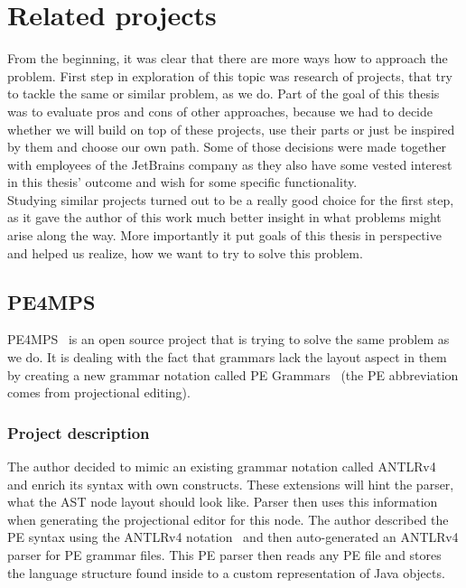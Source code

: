 \chapter{Related projects}
\label{chap:related_projects}

From the beginning, it was clear that there are more ways how to approach the problem. First step in exploration of this topic was research of projects, that try to tackle the same or similar problem, as we do. Part of the goal of this thesis was to evaluate pros and cons of other approaches, because we had to decide whether we will build on top of these projects, use their parts or just be inspired by them and choose our own path. Some of those decisions were made together with employees of the JetBrains company as they also have some vested interest in this thesis' outcome and wish for some specific functionality.
\\

Studying similar projects turned out to be a really good choice for the first step, as it gave the author of this work much better insight in what problems might arise along the way. More importantly it put goals of this thesis in perspective and helped us realize, how we want to try to solve this problem.

\section{PE4MPS}
PE4MPS~\cite{PE4MPS} is an open source project that is trying to solve the same problem as we do. It is dealing with the fact that grammars lack the layout aspect in them by creating a new grammar notation called PE Grammars~\cite{PE} (the PE abbreviation comes from projectional editing).
 
\subsection{Project description}
The author decided to mimic an existing grammar notation called ANTLRv4~\cite{ANTLR4} and enrich its syntax with own constructs. These extensions will hint the parser, what the AST node layout should look like. Parser then uses this information when generating the projectional editor for this node. The author described the PE syntax using the ANTLRv4 notation~\cite{ANTLR4reference} and then auto-generated an ANTLRv4 parser for PE grammar files. This PE parser then reads any PE file and stores the language structure found inside to a custom representation of Java objects.
\\

